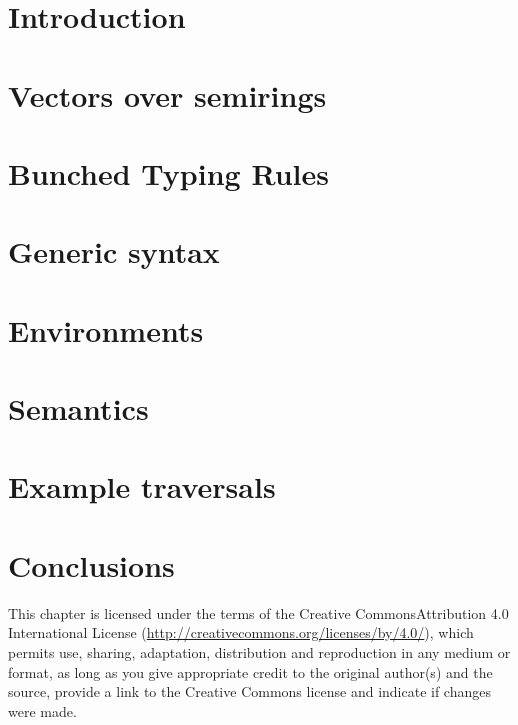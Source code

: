 \documentclass[runningheads]{llncs}
\begin{document}
\section{Introduction}\label{sec:intro}


\section{Vectors over semirings}\label{sec:algebra}


\section{Bunched Typing Rules}\label{sec:bunched-rules}


\section{Generic syntax}\label{sec:syntax}


\section{Environments}\label{sec:env}


\section{Semantics}\label{sec:semantics}


\section{Example traversals}\label{sec:examples}


\section{Conclusions}\label{sec:conc}


%
%
%



\vfill

{\small\medskip{} This chapter is licensed under the terms of the Creative Commons\break Attribution 4.0 International License (\url{http://creativecommons.org/licenses/by/4.0/}), which permits use, sharing, adaptation, distribution and reproduction in any medium or format, as long as you give appropriate credit to the original author(s) and the source, provide a link to the Creative Commons license and indicate if changes were made.}
\end{document}
